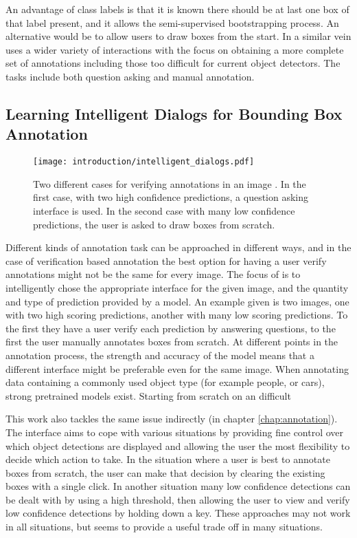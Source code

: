 An advantage of class labels is that it is known there should be at last one box of that label present, and it allows the semi-supervised bootstrapping process. An alternative would be to allow users to draw boxes from the start. In a similar vein \cite{Russakovsky2015a} uses a wider variety of interactions with the focus on obtaining a more complete set of annotations including those too difficult for current object detectors. The tasks include both question asking and manual annotation.

\subsection{Learning Intelligent Dialogs for Bounding Box Annotation}

\begin{figure}[h]
  \centering
  \texttt{[image: introduction/intelligent\_dialogs.pdf]}
  \caption{Two different cases for verifying annotations in an image \cite{Konyushkova2017}. In the first case, with two high confidence predictions, a question asking interface is used. In the second case with many low confidence predictions, the user is asked to draw boxes from scratch. }
  \label{fig:intelligent_dialogs}
\end{figure}

Different kinds of annotation task can be approached in different ways, and in the case of verification based annotation the best option for having a user verify annotations might not be the same for every image. The focus of \cite{Konyushkova2017} is to intelligently chose the appropriate interface for the given image, and the quantity and type of prediction provided by a model. An example given is two images, one with two high scoring predictions, another with many low scoring predictions. To the first they have a user  verify each prediction by answering questions, to the first the user manually annotates boxes from scratch. At different points in the annotation process, the strength and accuracy of the model means that a different interface might be preferable even for the same image. When annotating data containing a commonly used object type (for example people, or cars), strong pretrained models exist. Starting from scratch on an difficult 

This work also tackles the same issue indirectly (in chapter \ref{chap:annotation}). The interface aims to cope with various situations by providing fine control over which object detections are displayed and allowing the user the most flexibility to decide which action to take. In the situation where a user is best to annotate boxes from scratch, the user can make that decision by clearing the existing boxes with a single click. In another situation many low confidence detections can be dealt with by using a high threshold, then allowing the user to view and verify low confidence detections by holding down a key. These approaches may not work in all situations, but seems to provide a useful trade off in many situations.









